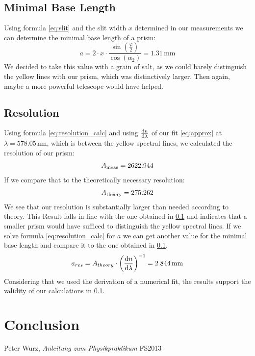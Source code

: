 \documentclass{scrreprt}
\newcommand{\unit}[1]{\ensuremath{\, \mathrm{#1}}}
\renewcommand{\phi}{\varphi}
\begin{document}
\subsection{Minimal Base Length}
\label{sec:base_length}

Using formula \ref{eq:slit} and the slit width $x$ determined in our measurements we can determine the minimal base length of a prism:
\begin{equation}
	a = 2 \cdot x \cdot \frac{\sin(\frac{\phi}{2})}{\cos({\alpha_2})} = 1.31 \unit{mm}	
\end{equation}
We decided to take this value with a grain of salt, as we could barely distinguish the yellow lines with our prism, which was distinctively larger. Then again, maybe a more powerful telescope would have helped.

\subsection{Resolution}
Using formula \ref{eq:resolution_calc} and using $\frac{\dif{n}}{\dif{\lambda}}$ of our fit \ref{eq:approx} at $\lambda = 578.05 \unit{nm}$, which is between the yellow spectral lines, we calculated the resolution of our prism:
\begin{equation}
	A_{\text{meas}} = 2622.944
	\notag
\end{equation}
If we compare that to the theoretically necessary resolution:
\begin{equation}
	A_{\text{theory}} = 275.262
	\notag
\end{equation}
We see that our resolution is substantially larger than needed according to theory. This Result falls in line with the one obtained in \ref{sec:base_length} and indicates that a smaller prism would have sufficed to distinguish the yellow spectral lines. If we solve formula \ref{eq:resolution_calc} for $a$ we can get another value for the minimal base length and compare it to the one obtained in \ref{sec:base_length}.
\begin{equation}
	a_{res} = A_{theory} \cdot \left(\frac{\dif{n}}{\dif{\lambda}}\right)^{-1} = 2.844 \unit{mm}
\notag
\end{equation}
Considering that we used the derivation of a numerical fit, the results support the validity of our calculations in \ref{sec:base_length}.



\section{Conclusion}

\begin{thebibliography}{9}

  Peter Wurz,
  \emph{Anleitung zum Physikpraktikum}
  FS2013

\end{thebibliography}
\end{document}
